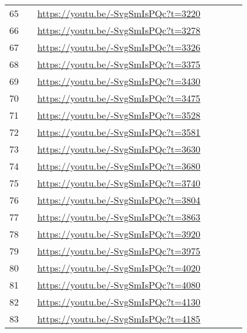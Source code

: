 \begin{longtable*}[]{ccp{2.0cm} p{5.0cm} p{5.0cm} p{5.0cm} p{5.0cm}}
65 &  & \url{https://youtu.be/-SvgSmIsPQc?t=3220} \\
66 &  & \url{https://youtu.be/-SvgSmIsPQc?t=3278} \\
67 &  & \url{https://youtu.be/-SvgSmIsPQc?t=3326} \\
68 &  & \url{https://youtu.be/-SvgSmIsPQc?t=3375} \\
69 &  & \url{https://youtu.be/-SvgSmIsPQc?t=3430} \\
70 &  & \url{https://youtu.be/-SvgSmIsPQc?t=3475} \\
71 &  & \url{https://youtu.be/-SvgSmIsPQc?t=3528} \\
72 &  & \url{https://youtu.be/-SvgSmIsPQc?t=3581} \\
73 &  & \url{https://youtu.be/-SvgSmIsPQc?t=3630} \\
74 &  & \url{https://youtu.be/-SvgSmIsPQc?t=3680} \\
75 &  & \url{https://youtu.be/-SvgSmIsPQc?t=3740} \\
76 &  & \url{https://youtu.be/-SvgSmIsPQc?t=3804} \\
77 &  & \url{https://youtu.be/-SvgSmIsPQc?t=3863} \\
78 &  & \url{https://youtu.be/-SvgSmIsPQc?t=3920} \\
79 &  & \url{https://youtu.be/-SvgSmIsPQc?t=3975} \\
80 &  & \url{https://youtu.be/-SvgSmIsPQc?t=4020} \\
81 &  & \url{https://youtu.be/-SvgSmIsPQc?t=4080} \\
82 &  & \url{https://youtu.be/-SvgSmIsPQc?t=4130} \\
83 &  & \url{https://youtu.be/-SvgSmIsPQc?t=4185} \\

\end{longtable*}
